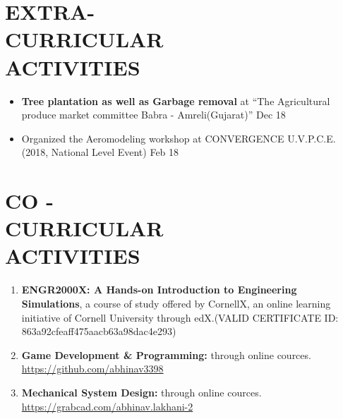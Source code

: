 \documentclass[margin]{res}
\begin{document}
    \section{EXTRA- \\ CURRICULAR \\ ACTIVITIES}
    \begin{itemize}
    \item \textbf{Tree plantation as well as Garbage removal} at “The Agricultural produce market committee Babra - Amreli(Gujarat)” \hfill{Dec 18}
    \item Organized the Aeromodeling workshop at CONVERGENCE U.V.P.C.E.(2018, National Level Event) \hfill{Feb 18}
    \end{itemize}
  
    \section{CO - \\ CURRICULAR \\ ACTIVITIES}
    \begin{enumerate}   
    \item \textbf{ENGR2000X: A Hands-on Introduction to Engineering Simulations}, a course of study offered by CornellX, an online learning initiative of Cornell University through edX.(VALID CERTIFICATE ID: 863a92cfeaff475aacb63a98dac4e293)
    \item \textbf{Game Development \& Programming: } through online cources.\\ \href{https://github.com/abhinav3398}{https://github.com/abhinav3398}
    \item \textbf{Mechanical System Design: } through online cources.\\ \href{https://grabcad.com/abhinav.lakhani-2}{https://grabcad.com/abhinav.lakhani-2}
    \end{enumerate}
\end{document}

